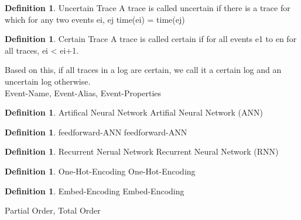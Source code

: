 \documentclass[
	a4paper,
	pagesize,
	pdftex,
	12pt,
	ngerman,
	fleqn,
	final,
	]{scrartcl}
\theoremstyle{plain}
\theoremstyle{definition}
\newtheorem{defn}[thm]{Definition}
\begin{document}
		\begin{defn}{Uncertain Trace}
			A trace is called uncertain if there is a trace for which for any two events ei, ej time(ei) = time(ej)
		\end{defn}
		\begin{defn}{Certain Trace}
			A trace is called certain if for all events e1 to en for all traces, ei < ei+1.
		\end{defn}
		Based on this, if all traces in a log are certain, we call it a certain log and an uncertain log otherwise. \\
		Event-Name, Event-Alias, Event-Properties \\
		\begin{defn}{Artifical Neural Network}
			Artifial Neural Network (ANN)
		\end{defn}
		\begin{defn}{feedforward-ANN}
			feedforward-ANN
		\end{defn}
		\begin{defn}{Recurrent Nerual Network}
			Recurrent Neural Network (RNN)
		\end{defn}
		\begin{defn}{One-Hot-Encoding}
			One-Hot-Encoding
		\end{defn}
		\begin{defn}{Embed-Encoding}
			Embed-Encoding
		\end{defn}
		Partial Order, Total Order \\ 
	
\end{document}

